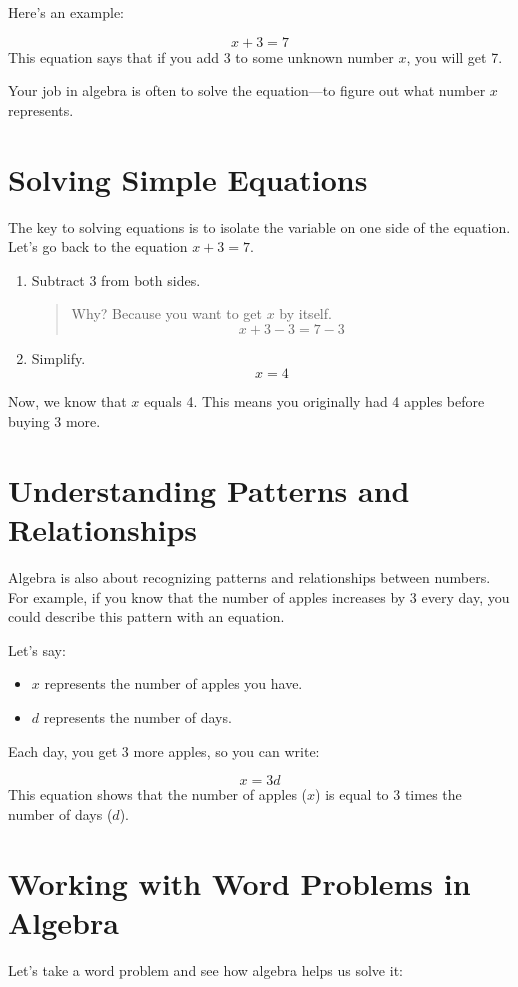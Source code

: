 Here’s an example:

\[ x + 3 = 7 \]
This equation says that if you add 3 to some unknown number $x$, you will get 7.

Your job in algebra is often to solve the equation—to figure out what number $x$ represents.

\section{Solving Simple Equations}
The key to solving equations is to isolate the variable on one side of the equation. Let’s go back to the equation $x + 3 = 7$.

\begin{enumerate}
    \item Subtract 3 from both sides.
    \begin{quote}
    Why? Because you want to get $x$ by itself.
    \[ x + 3 - 3 = 7 - 3 \]
    \end{quote}
    \item Simplify.
    \[ x = 4 \]
\end{enumerate}

Now, we know that $x$ equals 4. This means you originally had 4 apples before buying 3 more.

\section{Understanding Patterns and Relationships}
Algebra is also about recognizing patterns and relationships between numbers. For example, if you know that the number of apples increases by 3 every day, you could describe this pattern with an equation.

Let’s say:

\begin{itemize}
    \item $x$ represents the number of apples you have.
    \item $d$ represents the number of days.
\end{itemize}

Each day, you get 3 more apples, so you can write:

\[ x = 3d \]
This equation shows that the number of apples ($x$) is equal to 3 times the number of days ($d$).

\section{Working with Word Problems in Algebra}
Let’s take a word problem and see how algebra helps us solve it:

